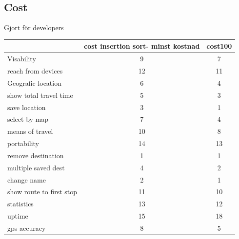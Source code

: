 \documentclass[a4paper]{article}
\begin{document}
	\subsection{Cost}
		Gjort för developers		
		\begin{tabular}{|l|c|c|}
			\hline
		
			&cost insertion sort- minst kostnad &cost100 \\
			\hline
			Visability	&9	&7 \\
			\hline
			reach from devices	&12	&11 \\
			\hline			
			Geografic location	&6	&4 \\
			\hline
			show total travel time	&5	&3 \\
			\hline
			save location	&3	&1 \\
			\hline
			select by map	&7	&4 \\
			\hline
			means of travel	&10	&8 \\
			\hline
			portability	&14	&13 \\
			\hline
			remove destination	&1	&1 \\
			\hline
			multiple saved dest	&4	&2 \\
			\hline
			change name	&2	&1 \\
			\hline
			show route to first stop	&11	&10 \\
			\hline
			statistics	&13	&12 \\
			\hline
			uptime	&15	&18 \\
			\hline
			gps accuracy	&8	&5 \\
			\hline
		\end{tabular}
\end{document}
